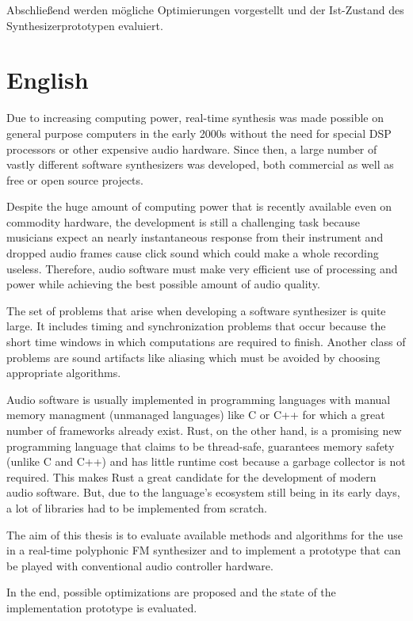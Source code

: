 Abschließend werden mögliche Optimierungen vorgestellt und der Ist-Zustand des Synthesizerprototypen evaluiert.

\section*{English}

Due to increasing computing power, real-time synthesis was made possible on general purpose computers in the early 2000s without the need for special DSP processors or other expensive audio hardware.
Since then, a large number of vastly different software synthesizers was developed, both commercial as well as free or open source projects.

Despite the huge amount of computing power that is recently available even on commodity hardware, the development is still a challenging task because musicians expect an nearly instantaneous response from their instrument and dropped audio frames cause click sound which could make a whole recording useless.
Therefore, audio software must make very efficient use of processing and power while achieving the best possible amount of audio quality.

The set of problems that arise when developing a software synthesizer is quite large.
It includes timing and synchronization problems that occur because the short time windows in which computations are required to finish.
Another class of problems are sound artifacts like aliasing which must be avoided by choosing appropriate algorithms.

Audio software is usually implemented in programming languages with manual memory managment (unmanaged languages) like C or C++ for which a great number of frameworks already exist.
Rust, on the other hand, is a promising new programming language that claims to be thread-safe, guarantees memory safety (unlike C and C++) and has little runtime cost because a garbage collector is not required.
This makes Rust a great candidate for the development of modern audio software.
But, due to the language's ecosystem still being in its early days, a lot of libraries had to be implemented from scratch.

The aim of this thesis is to evaluate available methods and algorithms for the use in a real-time polyphonic FM synthesizer and to implement a prototype that can be played with conventional audio controller hardware.

In the end, possible optimizations are proposed and the state of the implementation prototype is evaluated.

\sffamily{
	\begin{center}
		\textbf{\documentAuthor{}}\\
		\textsc{\university{}}\\
		\universityFaculty{}---\universityDepartment{}\\
		\documentTitle{}\\
		\germanDate{}\today{}\\
		\bigskip{}
	\end{center}
}
